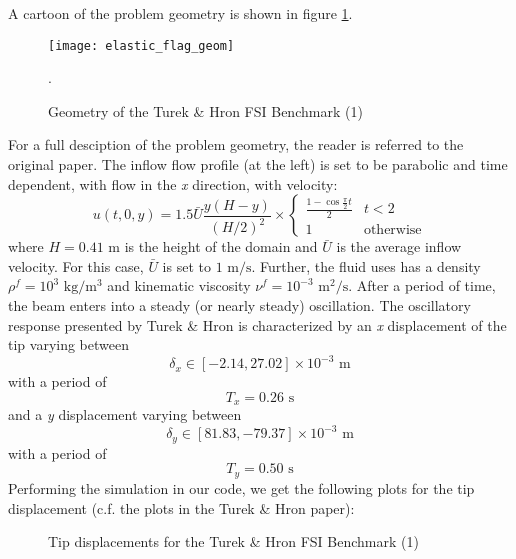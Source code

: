 \documentclass{article}
\begin{document}
\begin{enumerate}
A cartoon of the problem geometry is shown in figure \ref{fig:TurekHronGeometryFSI2}.
\begin{figure}[ht]
        \centering
        \texttt{[image: elastic\_flag\_geom]} 
        \caption{Geometry of the Turek \& Hron FSI Benchmark (1)}
        \label{fig:TurekHronGeometryFSI2}.
\end{figure}
For a full desciption of the problem geometry, the reader is referred to the original paper. 
The inflow flow profile (at the left) is set to be parabolic and time dependent, with flow in the \emph{x} direction, with velocity:
\begin{equation}  u(t,0,y) = 1.5\bar{U}\frac{y(H-y)}{(H/2)^2}\times \left\{ \begin{array}{ll} \frac{1-\cos{\frac{\pi}{2}t}}{2} & t < 2 \\ 1 & \mbox{otherwise} \end{array} \right. \label{eq:eq11300} \end{equation}
where $H = 0.41 \mbox{ m}$ is the height of the domain and $\bar{U}$ is the average inflow velocity.  
For this case, $\bar{U}$ is set to $1 \mbox{ m/s}$. 
Further, the fluid uses has a density $\rho^f = 10^3 \mbox { kg/m$^3$}$ and kinematic viscosity $\nu^f = 10^{-3} \mbox { m$^2$/s}$.
After a period of time, the beam enters into a steady (or nearly steady) oscillation.  
The oscillatory response presented by Turek \& Hron is characterized by an \emph{x} displacement of the tip varying between
\[ \delta_x \in [-2.14,27.02] \times 10^{-3} \mbox{ m} \]
with a period of
\[ T_x = 0.26 \mbox{ s} \]
and a \emph{y} displacement varying between
\[ \delta_y \in [81.83,-79.37] \times 10^{-3} \mbox{ m} \]
with a period of
\[ T_y = 0.50 \mbox{ s} \]
Performing the simulation in our code, we get the following plots for the tip displacement (c.f. the plots in the Turek \& Hron paper):
\begin{figure}[ht]
        \centering
        \caption{Tip displacements for the Turek \& Hron FSI Benchmark (1)}
\end{figure}


\end{enumerate}
\end{document}
